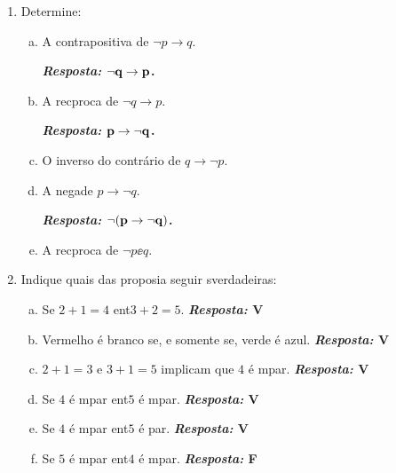 \begin{enumerate}[{\bf 1.}]
\begin{enumerate}[a)]
{\bf{\it Resposta:} Usa-se as tabelas verdade ou, apenas, observe que quando ${\bf p}$ \'e V e ${\bf q}$ \'e F ent\ao ${\bf (p\to q)}$ \'e F enquanto ${\bf q\to p}$ \'e V.}

\item $\lnot (p \to q)$; $\lnot p \to \lnot q$.

{\bf{\it Resposta:} Usa-se as tabelas verdade ou, apenas, observe que quando ${\bf p}$ \'e V e ${\bf q}$ \'e V ent\ao ${\bf \lnot (p \to q)}$ \'e F enquanto ${\bf \lnot p \to \lnot q}$ \'e V.}
\end{enumerate}

\item Determine:
\begin{enumerate}[a)]
\item A contrapositiva de $\lnot p\to q$. 

{\bf{\it Resposta:} ${\bf \lnot q \to p}$.}

\item A rec\ih proca de $\lnot q \to p$.

{\bf{\it Resposta:} ${\bf p \to \lnot q}$.}

\item O inverso do contr\'ario de $q \to \lnot p$.

\item A nega\cao de $p \to \lnot q$. 

{\bf{\it Resposta:} ${\bf \lnot (p \to\lnot q)}$.}

\item A rec\ih proca de $\lnot p \ee q$.
\end{enumerate}

\item Indique quais das proposi\coes a seguir s\ao verdadeiras:
\begin{enumerate}[a)]
\item Se $2+1=4$ ent\ao $3+2=5$. {\bf{\it Resposta:} V}
\item Vermelho \'e branco se, e somente se, verde \'e azul. {\bf{\it Resposta:} V}
\item $2+1=3$ e $3+1=5$ implicam que $4$ \'e \ih mpar. {\bf{\it Resposta:} V}
\item Se $4$ \'e \ih mpar ent\ao $5$ \'e \ih mpar. {\bf{\it Resposta:} V}
\item Se $4$ \'e \ih mpar ent\ao $5$ \'e par. {\bf{\it Resposta:} V}
\item Se $5$ \'e \ih mpar ent\ao $4$ \'e \ih mpar.  {\bf{\it Resposta:} F}
\end{enumerate}


\end{enumerate}
